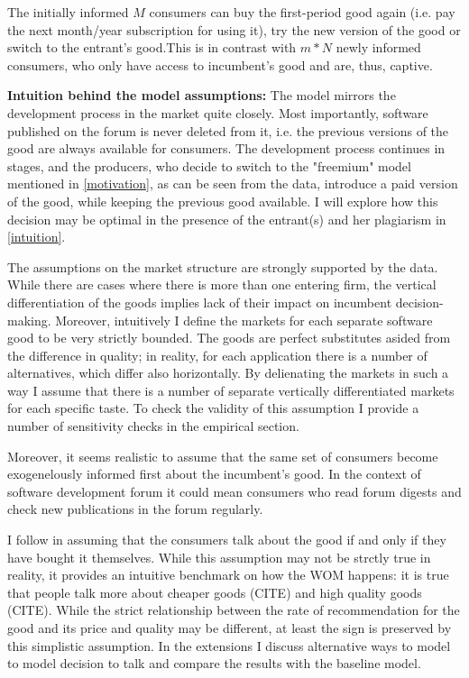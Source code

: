 \documentclass{article}
\numberwithin{figure}{section}
\numberwithin{table}{section}
\theoremstyle{indented}
\numberwithin{equation}{section} %
\begin{document}
The initially informed $M$ consumers can buy the first-period good again (i.e. pay the next month/year subscription for using it), try the new version of the good or switch to the entrant's good.This is in contrast with $m*N$ newly informed consumers, who only have access to incumbent's good and are, thus, captive.


\textbf{Intuition behind the model assumptions:} The model mirrors the development process in the market quite closely. Most importantly, software published on the forum is never deleted from it, i.e. the previous versions of the good are always available for consumers. The development process continues in stages, and the producers, who decide to switch to the "freemium" model mentioned in \ref{motivation}, as can be seen from the data, introduce a paid version of the good, while keeping the previous good available. I will explore how this decision may be optimal in the presence of the entrant(s) and her plagiarism in \ref{intuition}. 

The assumptions on the market structure are strongly supported by the data. While there are cases where there is more than one entering firm, the vertical differentiation of the goods implies lack of their impact on incumbent decision-making. Moreover, intuitively I define the markets for each separate software good to be very strictly bounded. The goods are perfect substitutes asided from the difference in quality; in reality, for each application there is a number of alternatives, which differ also horizontally. By delienating the markets in such a way I assume that there is a number of separate vertically differentiated markets for each specific taste. To check the validity of this assumption I provide a number of sensitivity checks in the empirical section.

Moreover, it seems realistic to assume that the same set of consumers become exogenelously informed first about the incumbent's good. In the context of software development forum it could mean consumers who read forum digests and check new publications in the forum regularly.

I follow \citet{Campbell2013} in assuming that the consumers talk about the good if and only if they have bought it themselves. While this assumption may not be strctly true in reality, it provides an intuitive benchmark on how the WOM happens: it is true that people talk more about cheaper goods (CITE) and high quality goods (CITE). While the strict relationship between the rate of recommendation for the good and its price and quality may be different, at least the sign is preserved by this simplistic assumption. In the extensions I discuss alternative ways to model to model decision to talk and compare the results with the baseline model.
\end{document}

